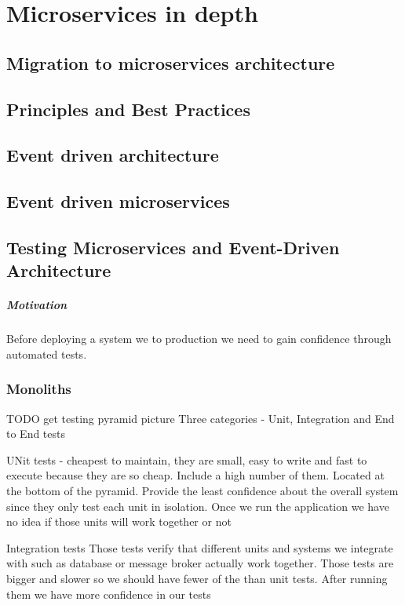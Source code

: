 \documentclass[a4paper, 11pt]{book}
\begin{document}
    \chapter{Microservices in depth}


    \section{Migration to microservices architecture}


    \section{Principles and Best Practices}


    \section{Event driven architecture}


    \section{Event driven microservices}


    \section{Testing Microservices and Event-Driven Architecture}

    \paragraph{Motivation} Before deploying a system we to production we need to gain confidence through automated tests.

    \subsection{Monoliths}
    TODO get testing pyramid picture
    Three categories - Unit, Integration and End to End tests

    UNit tests - cheapest to maintain, they are small, easy to write and fast to execute because they are so cheap.
    Include a high number of them.
    Located at the bottom of the pyramid.
    Provide the least confidence about the overall system since they only test each unit in isolation.
    Once we run the application we have no idea if those units will work together or not

    Integration tests
    Those tests verify that different units and systems we integrate with such as database or message broker actually work together.
    Those tests are bigger and slower so we should have fewer of the than unit tests.
    After running them we have more confidence in our tests
\end{document}
